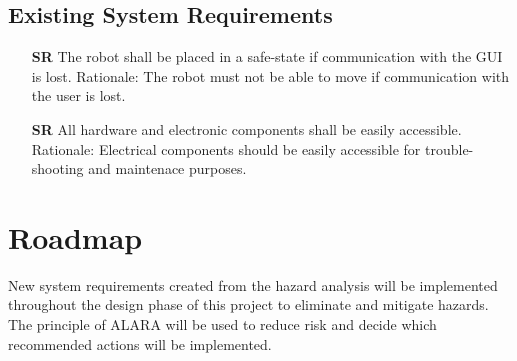 \documentclass[12pt]{article}
\newcounter{srnum} %
\begin{document}
\subsection{Existing System Requirements}

\begin{itemize}

\item[\textbf{SR\refstepcounter{srnum}\thesrnum \label{SR4}}] The robot shall be placed in a safe-state if communication with the GUI is lost.
\newline Rationale: The robot must not be able to move if communication with the user is lost.

\item[\textbf{SR\refstepcounter{srnum}\thesrnum \label{SR9}}]All hardware and electronic components shall be easily accessible.
\newline Rationale: Electrical components should be easily accessible for trouble-shooting and maintenace purposes.

\end{itemize}

\section{Roadmap}

New system requirements created from the hazard analysis will be implemented throughout the design phase of this project to eliminate and mitigate hazards. The principle of ALARA will be used to reduce risk and decide which recommended actions will be implemented. 
\end{document}
